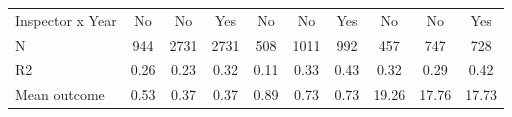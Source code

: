 \begin{tabular}{lccc|ccc|ccc}
Inspector x Year&          No         &          No         &         Yes         &          No         &          No         &         Yes         &          No         &          No         &         Yes         \\
N           &         944         &        2731         &        2731         &         508         &        1011         &         992         &         457         &         747         &         728         \\
R2          &        0.26         &        0.23         &        0.32         &        0.11         &        0.33         &        0.43         &        0.32         &        0.29         &        0.42         \\
Mean outcome&        0.53         &        0.37         &        0.37         &        0.89         &        0.73         &        0.73         &       19.26         &       17.76         &       17.73         \\
\bottomrule \end{tabular}
